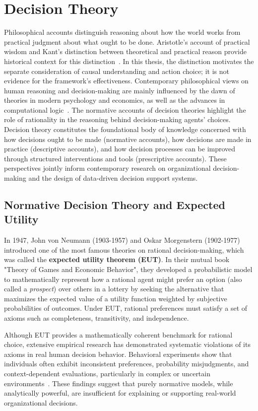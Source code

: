 \documentclass{sfuthesis}
\begin{document}
\section{Decision Theory}
Philosophical accounts distinguish reasoning about how the world works from practical judgment about what ought to be done. Aristotle's account of practical wisdom and Kant's distinction between theoretical and practical reason provide historical context for this distinction~\cite{bartlett_aristotles_2011,de_pierris_kant_2008}. In this thesis, the distinction motivates the separate consideration of causal understanding and action choice; it is not evidence for the framework's effectiveness.
Contemporary philosophical views on human reasoning and decision-making are mainly influenced by the dawn of theories in modern psychology and economics, as well as the advances in computational logic~\cite{steele_decision_2020}. The normative accounts of decision theories highlight the role of rationality in the reasoning behind decision-making agents’ choices. Decision theory constitutes the foundational body of knowledge concerned with how decisions ought to be made (normative accounts), how decisions are made in practice (descriptive accounts), and how decision processes can be improved through structured interventions and tools (prescriptive accounts). These perspectives jointly inform contemporary research on organizational decision-making and the design of data-driven decision support systems.
\subsection{Normative Decision Theory and Expected Utility}
In 1947, John von Neumann (1903-1957) and Oskar Morgenstern (1902-1977) introduced one of the most famous theories on rational decision-making, which was called the \textbf{expected utility theorem (EUT)}. In their mutual book "Theory of Games and Economic Behavior", they developed a probabilistic model to mathematically represent how a rational agent might prefer an option (also called a \textit{prospect}) over others in a lottery by seeking the alternative that maximizes the expected value of a utility function weighted by subjective probabilities of outcomes. Under EUT, rational preferences must satisfy a set of axioms such as completeness, transitivity, and independence.\par
Although EUT provides a mathematically coherent benchmark for rational choice, extensive empirical research has demonstrated systematic violations of its axioms in real human decision behavior. Behavioral experiments show that individuals often exhibit inconsistent preferences, probability misjudgments, and context-dependent evaluations, particularly in complex or uncertain environments~\cite{edwards_behavioral_1961, briggs_normative_2014}. These findings suggest that purely normative models, while analytically powerful, are insufficient for explaining or supporting real-world organizational decisions.
\end{document}
